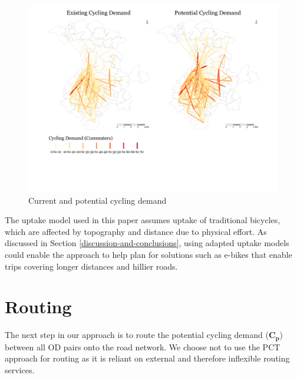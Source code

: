\documentclass[
]{article}
\begin{document}
\begin{figure}[H]

{\centering \includegraphics[width=0.65\linewidth]{data/Manchester/Plots/desire_facet_cycling} 

}

\caption{Current and potential cycling demand}\label{fig:desirefacetcycling}
\end{figure}

The uptake model used in this paper assumes uptake of traditional bicycles,
which are affected by topography and distance due to physical effort.
As discussed in Section \ref{discussion-and-conclusions}, using adapted uptake
models could enable the approach to help plan for solutions such as e-bikes
that enable trips covering longer distances and hillier roads.

\hypertarget{routing}{%
\section{Routing}\label{routing}}

The next step in our approach is to route the potential cycling demand
(\(\boldsymbol{C_{p}}\)) between all OD pairs onto the road network. We
choose not to use the PCT approach for routing as it is reliant on
external and therefore inflexible routing services.
\end{document}
